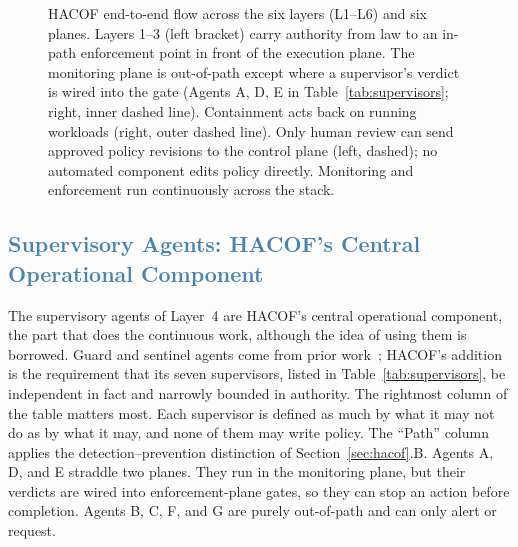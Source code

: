 \documentclass[journal]{IEEEtran}
\newcommand{\hacof}{HACOF}
\begin{document}
\begin{figure}[H]
{%
}
\caption{\hacof{} end-to-end flow across the six layers (L1--L6) and six planes. Layers 1--3 (left bracket) carry authority from law to an in-path enforcement point in front of the execution plane. The monitoring plane is out-of-path except where a supervisor's verdict is wired into the gate (Agents A, D, E in Table~\ref{tab:supervisors}; right, inner dashed line). Containment acts back on running workloads (right, outer dashed line). Only human review can send approved policy revisions to the control plane (left, dashed); no automated component edits policy directly. Monitoring and enforcement run continuously across the stack.}
\label{fig:hacof}
\end{figure}

\subsection{\textcolor{steelblue}{Supervisory Agents: \hacof's Central Operational Component}}
\label{sec:hacof-supervisors}

The supervisory agents of Layer~4 are \hacof's central operational component, the part that does the continuous work, although the idea of using them is borrowed. Guard and sentinel agents come from prior work~\cite{greenblatt2024aicontrol,shavit2023agentic,xiang2025guardagent,gosmar2025sentinel};
\hacof's addition is the requirement that its seven supervisors, listed in Table~\ref{tab:supervisors}, be independent in fact and narrowly bounded in authority. The rightmost column of the table matters most. Each supervisor is defined as much by what it may not do as by what it may, and none of them may write policy. The ``Path'' column applies the detection--prevention distinction of Section~\ref{sec:hacof}.B. Agents A, D, and E straddle two planes. They run in the monitoring plane, but their verdicts are wired into enforcement-plane gates, so they can stop an action before completion. Agents B, C, F, and G are purely out-of-path and can only alert or request.
\end{document}
